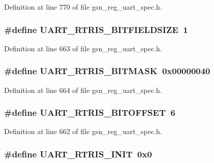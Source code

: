Definition at line 770 of file gsn\_\-reg\_\-uart\_\-spec.h.

\hypertarget{a00575_a55b20f3d35d962f42756c266d1fa16db}{
\subsubsection[{UART\_\-RTRIS\_\-BITFIELDSIZE}]{\setlength{\rightskip}{0pt plus 5cm}\#define UART\_\-RTRIS\_\-BITFIELDSIZE~1}}
\label{a00575_a55b20f3d35d962f42756c266d1fa16db}


Definition at line 663 of file gsn\_\-reg\_\-uart\_\-spec.h.

\hypertarget{a00575_ac06470a9c8fa58957a5cd9c29eb5daed}{
\subsubsection[{UART\_\-RTRIS\_\-BITMASK}]{\setlength{\rightskip}{0pt plus 5cm}\#define UART\_\-RTRIS\_\-BITMASK~0x00000040}}
\label{a00575_ac06470a9c8fa58957a5cd9c29eb5daed}


Definition at line 664 of file gsn\_\-reg\_\-uart\_\-spec.h.

\hypertarget{a00575_a59f4f71e659883834ecf44c162914859}{
\subsubsection[{UART\_\-RTRIS\_\-BITOFFSET}]{\setlength{\rightskip}{0pt plus 5cm}\#define UART\_\-RTRIS\_\-BITOFFSET~6}}
\label{a00575_a59f4f71e659883834ecf44c162914859}


Definition at line 662 of file gsn\_\-reg\_\-uart\_\-spec.h.

\hypertarget{a00575_ae1c0cb73768da4d7a2a6301f689f1add}{
\subsubsection[{UART\_\-RTRIS\_\-INIT}]{\setlength{\rightskip}{0pt plus 5cm}\#define UART\_\-RTRIS\_\-INIT~0x0}}
\label{a00575_ae1c0cb73768da4d7a2a6301f689f1add}


